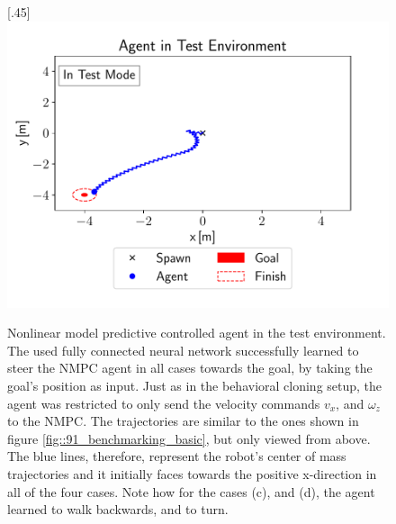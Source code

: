\begin{figure}[h!]
	[.45\linewidth]{\includegraphics[scale=.45]{chapters/11_autonomous_walking_experiments/img/test_mode_m4_m4.pdf}}
	\caption{Nonlinear model predictive controlled agent in the test environment. The used fully connected neural network successfully learned to steer the NMPC agent in all cases towards the goal, by taking the goal's position as input. Just as in the behavioral cloning setup, the agent was restricted to only send the velocity commands $v_x$, and $\omega_z$ to the NMPC. The trajectories are similar to the ones shown in figure \ref{fig::91_benchmarking_basic}, but only viewed from above. The blue lines, therefore, represent the robot's center of mass trajectories and it initially faces towards the positive x-direction in all of the four cases. Note how for the cases (c), and (d), the agent learned to walk backwards, and to turn.}	
	\label{fig::432_nmpc_ppo_env}
\end{figure} 
